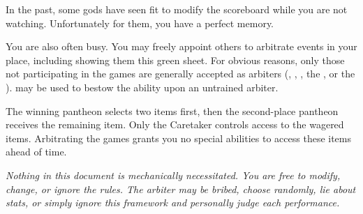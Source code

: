 \documentclass[green]{guardians}
\begin{document}
In the past, some gods have seen fit to modify the scoreboard while you are not watching. Unfortunately for them, you have a perfect memory.

You are also often busy. You may freely appoint others to arbitrate events in your place, including showing them this green sheet. For obvious reasons, only those not participating in the games are generally accepted as arbiters (\cAmaterasu{}, \cKachiko{}, \cJascha{}, the \cCaretaker{}, or the \cWarden{}). \iMirror{} may be used to bestow the \aExamine{} ability upon an untrained arbiter.

The winning pantheon selects two items first, then the second-place pantheon receives the remaining item. Only the Caretaker controls access to the wagered items. Arbitrating the games grants you no special abilities to access these items ahead of time.

\emph{Nothing in this document is mechanically necessitated. You are free to modify, change, or ignore the rules. The arbiter may be bribed, choose randomly, lie about stats, or simply ignore this framework and personally judge each performance.}
\end{document}
